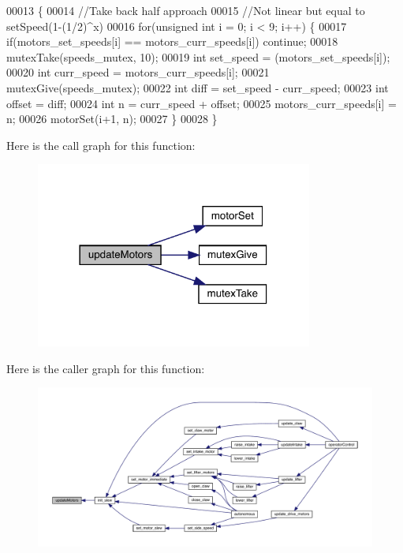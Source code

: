 \begin{DoxyCode}
00013                    \{
00014   \textcolor{comment}{//Take back half approach}
00015   \textcolor{comment}{//Not linear but equal to setSpeed(1-(1/2)^x)}
00016   \textcolor{keywordflow}{for}(\textcolor{keywordtype}{unsigned} \textcolor{keywordtype}{int} i = 0; i < 9; i++) \{
00017     \textcolor{keywordflow}{if}(motors_set_speeds[i] == motors_curr_speeds[i]) \textcolor{keywordflow}{continue};
00018     mutexTake(speeds_mutex, 10);
00019     \textcolor{keywordtype}{int} set\_speed = (motors_set_speeds[i]);
00020     \textcolor{keywordtype}{int} curr\_speed = motors_curr_speeds[i];
00021     mutexGive(speeds_mutex);
00022     \textcolor{keywordtype}{int} diff = set\_speed - curr\_speed;
00023     \textcolor{keywordtype}{int} offset = diff;
00024     \textcolor{keywordtype}{int} n = curr\_speed + offset;
00025     motors_curr_speeds[i] = n;
00026     motorSet(i+1, n);
00027   \}
00028 \}
\end{DoxyCode}
Here is the call graph for this function\+:\nopagebreak
\begin{figure}[H]
\begin{center}
\leavevmode
\includegraphics[width=258pt]{slew_8c_a807a87c5df438fde21c1e8213906695b_cgraph}
\end{center}
\end{figure}
Here is the caller graph for this function\+:\nopagebreak
\begin{figure}[H]
\begin{center}
\leavevmode
\includegraphics[width=350pt]{slew_8c_a807a87c5df438fde21c1e8213906695b_icgraph}
\end{center}
\end{figure}


